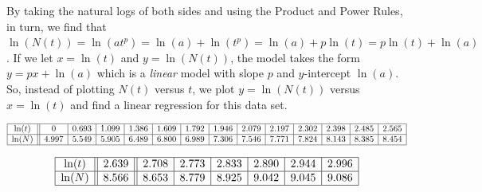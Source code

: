\smallskip

By taking the natural logs of both sides and using the Product and Power Rules, in turn, we find that $\ln(N(t)) = \ln(a t^p) = \ln(a) + \ln(t^p) = \ln(a) + p \ln(t) =  p \ln(t) + \ln(a)$.   If we let  $x = \ln(t)$ and $y= \ln(N(t))$,  the model takes the form $y = p x + \ln(a)$ which is a \textit{linear} model with slope $p$ and $y$-intercept $\ln(a)$.  So, instead of plotting $N(t)$ versus $t$, we plot $y=\ln(N(t))$ versus $x=\ln(t)$ and find a linear regression for this data set.

\[ \begin{array}{|c||c|c|c|c|c|c|c|c|c|c|c|c|c|}  \hline

\ln(t) & 0 & 0.693 & 1.099 & 1.386& 1.609 & 1.792 & 1.946 & 2.079 & 2.197 & 2.302 & 2.398 & 2.485 & 2.565  \\ \hline

\ln(N) & 4.997  & 5.549 &  5.905 & 6.489 & 6.800 & 6.989 & 7.306 & 7.546 & 7.771 & 7.824 & 8.143 & 8.385 & 8.454  \\ \hline \end{array} \]


\[\begin{array}{|c||c||c|c|c|c|c|c|} \hline

\ln(t) & 2.639 & 2.708 & 2.773 & 2.833 & 2.890 & 2.944 & 2.996  \\ \hline 

\ln(N) & 8.566 & 8.653 & 8.779 & 8.925 & 9.042 & 9.045 & 9.086    \\ \hline \end{array} \]

